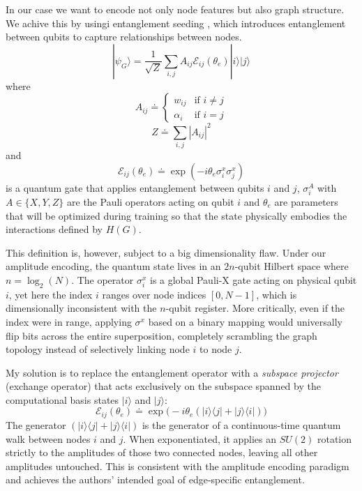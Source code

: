 In our case we want to encode not only node features but also graph structure. We achive this by usingi entanglement seeding \cite{mainarticle}, which introduces entanglement between qubits to capture relationships between nodes.
\begin{equation}\label{statedef}
    |\psi_{G}\rangle=\frac{1}{\sqrt{Z}}\sum_{i,j}A_{ij}\mathcal{E}_{ij}(\theta_{e})|i\rangle|j\rangle
\end{equation}
where
\begin{equation}
    A_{ij} \doteq \begin{cases}
        w_{ij}   & \text{if } i \neq j \\
        \alpha_i & \text{if } i = j
    \end{cases}
\end{equation}
\begin{equation}
    Z \doteq \sum_{i,j} |A_{ij}|^{2}
\end{equation}
and
\begin{equation}
    \mathcal{E}_{ij}(\theta_{e}) \doteq \exp(-i\theta_{e}\sigma_{i}^{x}\sigma_{j}^{x})
\end{equation}
is a quantum gate that applies entanglement between qubits $i$ and $j$, \(\sigma_i^A\) with \(A \in \{X, Y, Z\}\) are the Pauli operators acting on qubit \(i\) and $\theta_{e}$ are parameters that will be optimized during training so that the state physically embodies the interactions defined by $H(G)$.

This definition is, however, subject to a big dimensionality flaw. Under our amplitude encoding, the quantum state lives in an $2n$-qubit Hilbert space where $n = \log_2(N)$. The operator $\sigma_i^x$ is a global Pauli-X gate acting on physical qubit $i$, yet here the index $i$ ranges over node indices $[0, N-1]$, which is dimensionally inconsistent with the $n$-qubit register. More critically, even if the index were in range, applying $\sigma^x$ based on a binary mapping would universally flip bits across the entire superposition, completely scrambling the graph topology instead of selectively linking node $i$ to node $j$.

My solution is to replace the entanglement operator with a \textit{subspace projector} (exchange operator) that acts exclusively on the subspace spanned by the computational basis states $|i\rangle$ and $|j\rangle$:
\begin{equation}
    \mathcal{E}_{ij}(\theta_{e}) \doteq \exp\bigl(-i\theta_{e}(|i\rangle\langle j| + |j\rangle\langle i|)\bigr)
\end{equation}
The generator $(|i\rangle\langle j| + |j\rangle\langle i|)$ is the generator of a continuous-time quantum walk between nodes $i$ and $j$. When exponentiated, it applies an $SU(2)$ rotation strictly to the amplitudes of those two connected nodes, leaving all other amplitudes untouched. This is consistent with the amplitude encoding paradigm and achieves the authors' intended goal of edge-specific entanglement.

